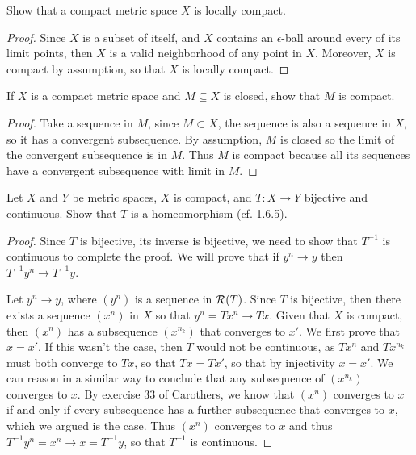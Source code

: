 \begin{exercise}{6}
Show that a compact metric space $X$ is locally compact.
\end{exercise}
\begin{proof}
Since $X$ is a subset of itself, and $X$ contains an $\epsilon$-ball around every of its limit points, then $X$ is a valid neighborhood of any point in $X$. Moreover, $X$ is compact by assumption, so that $X$ is locally compact.
\end{proof}

\begin{exercise}{9}
If $X$ is a compact metric space and $M\subseteq X$ is closed, show that $M$ is compact.
\end{exercise}
\begin{proof}
Take a sequence in $M$, since $M\subset X$, the sequence is also a sequence in $X$, so it has a convergent subsequence. By assumption, $M$ is closed so the limit of the convergent subsequence is in $M$. Thus $M$ is compact because all its sequences have a convergent subsequence with limit in $M$.
\end{proof}

\begin{exercise}{10}
Let $X$ and $Y$ be metric spaces, $X$ is compact, and $T:X\to Y$ bijective and continuous. Show that $T$ is a homeomorphism (cf. 1.6.5).
\end{exercise}
\begin{proof}
Since $T$ is bijective, its inverse is bijective, we need to show that $T^{-1}$ is continuous to complete the proof. We will prove that if $y^n\to y$ then $T^{-1}y^n\to T^{-1}y$.

Let $y^n\to y$, where $(y^n)$ is a sequence in $\mathcal{R}(T)$. Since $T$ is bijective, then there exists a sequence $(x^n)$ in $X$ so that $y^n=Tx^n\to Tx$. Given that $X$ is compact, then $(x^n)$ has a subsequence $(x^{n_k})$ that converges to $x'$. We first prove that $x=x'$. If this wasn't the case, then $T$ would not be continuous, as $Tx^n$ and $Tx^{n_k}$ must both converge to $Tx$, so that $Tx=Tx'$, so that by injectivity $x=x'$. We can reason in a similar way to conclude that any subsequence of $(x^{n_k})$ converges to $x$. By exercise 33 of Carothers, we know that $(x^n)$ converges to $x$ if and only if every subsequence has a further subsequence that converges to $x$, which we argued is the case. Thus $(x^n)$ converges to $x$ and thus $T^{-1}y^n =x^n \to x=T^{-1}y$, so that $T^{-1}$ is continuous. 
\end{proof}
